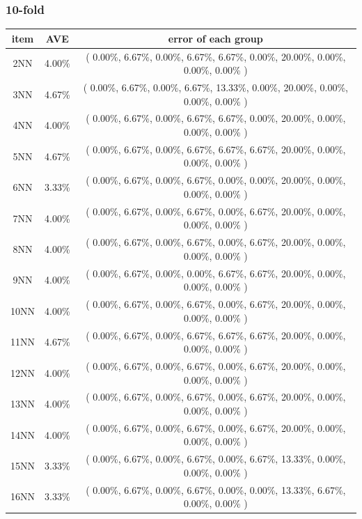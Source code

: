 \documentclass[11pt,a4paper]{article}
\begin{document}
\hypertarget{tenFoldResultNorm}{}
\subsubsection{10-fold}
\begin{center}
    \begin{tabular} {|| c | c | c ||}
        \hline
        item  & AVE & error of each group \\ \hline
2NN & 4.00\% & ( 0.00\%, 6.67\%, 0.00\%, 6.67\%, 6.67\%, 0.00\%, 20.00\%, 0.00\%, 0.00\%, 0.00\% ) \\ \hline
3NN & 4.67\% & ( 0.00\%, 6.67\%, 0.00\%, 6.67\%, 13.33\%, 0.00\%, 20.00\%, 0.00\%, 0.00\%, 0.00\% ) \\ \hline
4NN & 4.00\% & ( 0.00\%, 6.67\%, 0.00\%, 6.67\%, 6.67\%, 0.00\%, 20.00\%, 0.00\%, 0.00\%, 0.00\% ) \\ \hline
5NN & 4.67\% & ( 0.00\%, 6.67\%, 0.00\%, 6.67\%, 6.67\%, 6.67\%, 20.00\%, 0.00\%, 0.00\%, 0.00\% ) \\ \hline
6NN & 3.33\% & ( 0.00\%, 6.67\%, 0.00\%, 6.67\%, 0.00\%, 0.00\%, 20.00\%, 0.00\%, 0.00\%, 0.00\% ) \\ \hline
7NN & 4.00\% & ( 0.00\%, 6.67\%, 0.00\%, 6.67\%, 0.00\%, 6.67\%, 20.00\%, 0.00\%, 0.00\%, 0.00\% ) \\ \hline
8NN & 4.00\% & ( 0.00\%, 6.67\%, 0.00\%, 6.67\%, 0.00\%, 6.67\%, 20.00\%, 0.00\%, 0.00\%, 0.00\% ) \\ \hline
9NN & 4.00\% & ( 0.00\%, 6.67\%, 0.00\%, 0.00\%, 6.67\%, 6.67\%, 20.00\%, 0.00\%, 0.00\%, 0.00\% ) \\ \hline
10NN & 4.00\% & ( 0.00\%, 6.67\%, 0.00\%, 6.67\%, 0.00\%, 6.67\%, 20.00\%, 0.00\%, 0.00\%, 0.00\% ) \\ \hline
11NN & 4.67\% & ( 0.00\%, 6.67\%, 0.00\%, 6.67\%, 6.67\%, 6.67\%, 20.00\%, 0.00\%, 0.00\%, 0.00\% ) \\ \hline
12NN & 4.00\% & ( 0.00\%, 6.67\%, 0.00\%, 6.67\%, 0.00\%, 6.67\%, 20.00\%, 0.00\%, 0.00\%, 0.00\% ) \\ \hline
13NN & 4.00\% & ( 0.00\%, 6.67\%, 0.00\%, 6.67\%, 0.00\%, 6.67\%, 20.00\%, 0.00\%, 0.00\%, 0.00\% ) \\ \hline
14NN & 4.00\% & ( 0.00\%, 6.67\%, 0.00\%, 6.67\%, 0.00\%, 6.67\%, 20.00\%, 0.00\%, 0.00\%, 0.00\% ) \\ \hline
15NN & 3.33\% & ( 0.00\%, 6.67\%, 0.00\%, 6.67\%, 0.00\%, 6.67\%, 13.33\%, 0.00\%, 0.00\%, 0.00\% ) \\ \hline
16NN & 3.33\% & ( 0.00\%, 6.67\%, 0.00\%, 6.67\%, 0.00\%, 0.00\%, 13.33\%, 6.67\%, 0.00\%, 0.00\% ) \\ \hline

\end{tabular}
\end{center}
\end{document}
